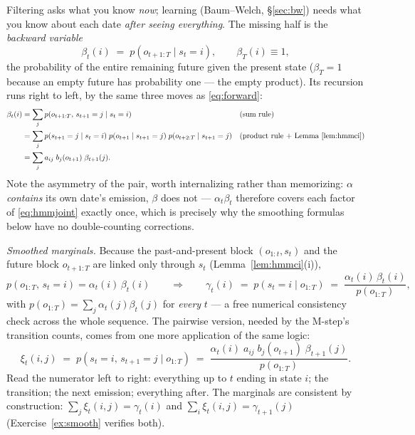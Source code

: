 \documentclass[11pt]{article}
\numberwithin{equation}{section}
\theoremstyle{plain}
\theoremstyle{definition}
\theoremstyle{remark}
\newcommand{\resp}{\gamma}
\begin{document}
Filtering asks what you know \emph{now}; learning (Baum--Welch, \S\ref{sec:bw}) needs what you know about each date \emph{after seeing everything}. The missing half is the \emph{backward variable}
\begin{equation}
\beta_t(i) \;=\; p(o_{t+1:T} \mid s_t = i),
\qquad \beta_T(i) \equiv 1,
\label{eq:betadef}
\end{equation}
the probability of the entire remaining future given the present state ($\beta_T = 1$ because an empty future has probability one --- the empty product). Its recursion runs right to left, by the same three moves as \eqref{eq:forward}:
\begin{align}
\beta_t(i)
&= \sum_j p(o_{t+1:T},\, s_{t+1} = j \mid s_t = i)
&&\text{(sum rule)}\notag\\
&= \sum_j p(s_{t+1} = j \mid s_t = i)\; p(o_{t+1} \mid s_{t+1} = j)\; p(o_{t+2:T} \mid s_{t+1} = j)
&&\text{(product rule + Lemma \ref{lem:hmmci})}\notag\\
&= \sum_j a_{ij}\; b_j(o_{t+1})\; \beta_{t+1}(j).
\label{eq:backward}
\end{align}
Note the asymmetry of the pair, worth internalizing rather than memorizing: $\alpha$ \emph{contains} its own date's emission, $\beta$ does not --- $\alpha_t \beta_t$ therefore covers each factor of \eqref{eq:hmmjoint} exactly once, which is precisely why the smoothing formulas below have no double-counting corrections.

\emph{Smoothed marginals.} Because the past-and-present block $(o_{1:t}, s_t)$ and the future block $o_{t+1:T}$ are linked only through $s_t$ (Lemma~\ref{lem:hmmci}(i)),
\begin{equation}
p(o_{1:T},\, s_t = i) = \alpha_t(i)\, \beta_t(i)
\qquad\Longrightarrow\qquad
\resp_t(i) \;=\; p(s_t = i \mid o_{1:T}) \;=\; \frac{\alpha_t(i)\, \beta_t(i)}{p(o_{1:T})},
\label{eq:gamma}
\end{equation}
with $p(o_{1:T}) = \sum_j \alpha_t(j)\beta_t(j)$ for \emph{every} $t$ --- a free numerical consistency check across the whole sequence. The pairwise version, needed by the M-step's transition counts, comes from one more application of the same logic:
\begin{equation}
\xi_t(i, j) \;=\; p(s_t = i,\, s_{t+1} = j \mid o_{1:T})
\;=\; \frac{\alpha_t(i)\; a_{ij}\; b_j(o_{t+1})\; \beta_{t+1}(j)}{p(o_{1:T})} .
\label{eq:xi}
\end{equation}
Read the numerator left to right: everything up to $t$ ending in state $i$; the transition; the next emission; everything after. The marginals are consistent by construction: $\sum_j \xi_t(i,j) = \resp_t(i)$ and $\sum_i \xi_t(i,j) = \resp_{t+1}(j)$ (Exercise~\ref{ex:smooth} verifies both).
\end{document}
